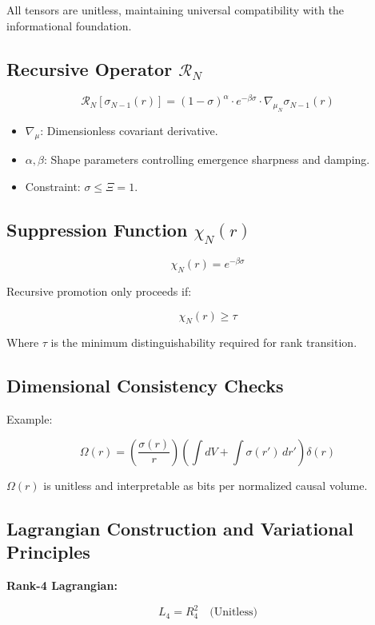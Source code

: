 \documentclass[12pt,a4paper]{article}
\begin{document}
All tensors are unitless, maintaining universal compatibility with the informational foundation.

\subsection{Recursive Operator \(\mathcal{R}_N\)}

\[
\mathcal{R}_N[\sigma_{N-1}(r)] = (1 - \sigma)^\alpha \cdot e^{-\beta \sigma} \cdot \nabla_{\mu_N} \sigma_{N-1}(r)
\]

\begin{itemize}
    \item \(\nabla_{\mu}\): Dimensionless covariant derivative.  
    \item \(\alpha, \beta\): Shape parameters controlling emergence sharpness and damping.  
    \item Constraint: \(\sigma \leq \Xi = 1\).
\end{itemize}

\subsection{Suppression Function \(\chi_N(r)\)}

\[
\chi_N(r) = e^{-\beta \sigma}
\]

Recursive promotion only proceeds if:

\[
\chi_N(r) \geq \tau
\]

Where \(\tau\) is the minimum distinguishability required for rank transition.

\subsection{Dimensional Consistency Checks}

Example:

\[
\Omega(r) = \left( \frac{\sigma(r)}{r} \right) \left( \int dV + \int \sigma(r') \, dr' \right) \delta(r)
\]

\(\Omega(r)\) is unitless and interpretable as bits per normalized causal volume.

\subsection{Lagrangian Construction and Variational Principles}

\textbf{Rank-4 Lagrangian:}

\[
L_4 = R_4^2 \quad \text{(Unitless)}
\]
\end{document}
